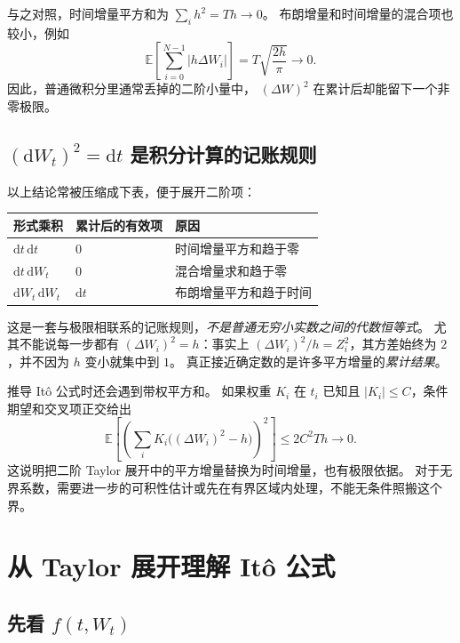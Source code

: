 \documentclass[11pt,a4paper,fontset=none]{ctexart}
\numberwithin{equation}{section}
\newcommand{\E}{\mathbb E}
\begin{document}
与之对照，时间增量平方和为 $\sum_i h^2=Th\to0$。
布朗增量和时间增量的混合项也较小，例如
\begin{equation}
  \E\!\left[\sum_{i=0}^{N-1}|h\Delta W_i|\right]
  =T\sqrt{\frac{2h}{\pi}}\longrightarrow0.
  \label{bg:eq:mixed-increment}
\end{equation}
因此，普通微积分里通常丢掉的二阶小量中，
$(\Delta W)^2$ 在累计后却能留下一个非零极限。

\subsection{$(\mathrm dW_t)^2=\mathrm dt$ 是积分计算的记账规则}
\label{bg:sub:ito-table}

以上结论常被压缩成下表，便于展开二阶项：
\begin{center}
\begin{tabular}{lll}
\toprule
形式乘积 & 累计后的有效项 & 原因\\
\midrule
$\mathrm dt\,\mathrm dt$ & $0$ & 时间增量平方和趋于零\\
$\mathrm dt\,\mathrm dW_t$ & $0$ & 混合增量求和趋于零\\
$\mathrm dW_t\,\mathrm dW_t$ & $\mathrm dt$ & 布朗增量平方和趋于时间\\
\bottomrule
\end{tabular}
\end{center}
这是一套与极限相联系的记账规则，\emph{不是普通无穷小实数之间的代数恒等式}。
尤其不能说每一步都有 $(\Delta W_i)^2=h$：事实上
$(\Delta W_i)^2/h=Z_i^2$，其方差始终为 $2$，并不因为 $h$ 变小就集中到 $1$。
真正接近确定数的是许多平方增量的\emph{累计结果}。

推导 It\^o 公式时还会遇到带权平方和。
如果权重 $K_i$ 在 $t_i$ 已知且 $|K_i|\leq C$，条件期望和交叉项正交给出
\begin{equation}
  \E\!\left[\left(\sum_i K_i\big((\Delta W_i)^2-h\big)\right)^2\right]
  \leq 2C^2Th\longrightarrow0.
  \label{bg:eq:weighted-qv}
\end{equation}
这说明把二阶 Taylor 展开中的平方增量替换为时间增量，也有极限依据。
对于无界系数，需要进一步的可积性估计或先在有界区域内处理，不能无条件照搬这个界。

\section{从 Taylor 展开理解 It\^o 公式}
\label{bg:sec:ito-formula}

\subsection{先看 $f(t,W_t)$}
\label{bg:sub:ito-taylor}
\end{document}
